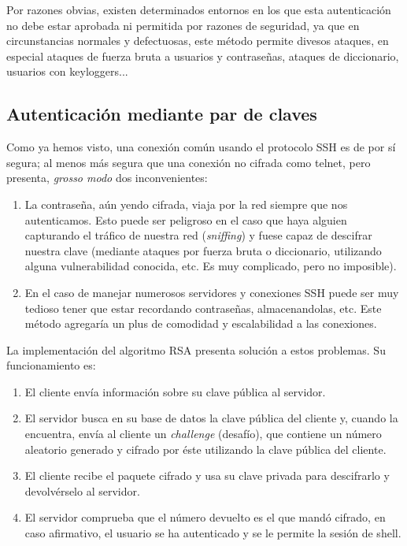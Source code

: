 \documentclass[a4paper, 11pt, titlepage]{article}
\begin{document}
        Por razones obvias, existen determinados entornos en los que esta autenticación no debe estar aprobada ni permitida 
        por razones de seguridad, ya que en circunstancias normales y defectuosas, este método permite divesos ataques, en especial 
        ataques de fuerza bruta a usuarios y contraseñas, ataques de diccionario, usuarios con keyloggers...

    \subsection{Autenticación mediante par de claves}\label{PubkeyAuthentication}

        Como ya hemos visto, una conexión común usando el protocolo SSH es de por sí 
        segura; al menos más segura que una conexión no cifrada como telnet, pero presenta,
        \textit{grosso modo} dos inconvenientes:

        \begin{enumerate}
            \item La contraseña, aún yendo cifrada, viaja por la red siempre que nos autenticamos.
            Esto puede ser peligroso en el caso que haya alguien capturando el tráfico de nuestra 
            red (\textit{sniffing}) y fuese capaz de descifrar nuestra clave (mediante ataques por 
            fuerza bruta o diccionario, utilizando alguna vulnerabilidad conocida, etc. Es muy 
            complicado, pero no imposible).
            \item En el caso de manejar numerosos servidores y conexiones SSH puede ser muy tedioso 
            tener que estar recordando contraseñas, almacenandolas, etc. Este método agregaría un plus 
            de comodidad y escalabilidad a las conexiones.
        \end{enumerate}

        La implementación del algoritmo RSA presenta solución a estos problemas. Su funcionamiento
        es:

        \begin{enumerate}
            \item El cliente envía información sobre su clave pública al servidor.
            \item El servidor busca en su base de datos la clave pública del cliente y, cuando la encuentra,
            envía al cliente un \textit{challenge} (desafío), que contiene un número aleatorio generado y 
            cifrado por éste utilizando la clave pública del cliente.
            \item El cliente recibe el paquete cifrado y usa su clave privada para descifrarlo y devolvérselo 
            al servidor.
            \item El servidor comprueba que el número devuelto es el que mandó cifrado, en caso afirmativo, el 
            usuario se ha autenticado y se le permite la sesión de shell.
        \end{enumerate}
\end{document}
